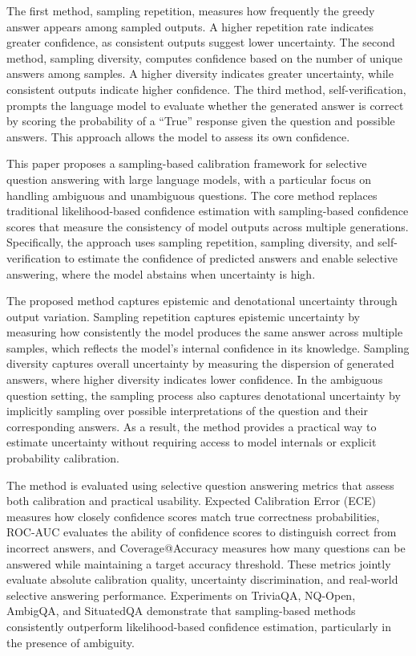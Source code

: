The first method, sampling repetition, measures how frequently the greedy answer appears among sampled outputs. A higher repetition rate indicates greater confidence, as consistent outputs suggest lower uncertainty. The second method, sampling diversity, computes confidence based on the number of unique answers among samples. A higher diversity indicates greater uncertainty, while consistent outputs indicate higher confidence. The third method, self-verification, prompts the language model to evaluate whether the generated answer is correct by scoring the probability of a ``True'' response given the question and possible answers. This approach allows the model to assess its own confidence.

This paper proposes a sampling-based calibration framework for selective question answering with large language models, with a particular focus on handling ambiguous and unambiguous questions. The core method replaces traditional likelihood-based confidence estimation with sampling-based confidence scores that measure the consistency of model outputs across multiple generations. Specifically, the approach uses sampling repetition, sampling diversity, and self-verification to estimate the confidence of predicted answers and enable selective answering, where the model abstains when uncertainty is high.

The proposed method captures epistemic and denotational uncertainty through output variation. Sampling repetition captures epistemic uncertainty by measuring how consistently the model produces the same answer across multiple samples, which reflects the model’s internal confidence in its knowledge. Sampling diversity captures overall uncertainty by measuring the dispersion of generated answers, where higher diversity indicates lower confidence. In the ambiguous question setting, the sampling process also captures denotational uncertainty by implicitly sampling over possible interpretations of the question and their corresponding answers. As a result, the method provides a practical way to estimate uncertainty without requiring access to model internals or explicit probability calibration.

The method is evaluated using selective question answering metrics that assess both calibration and practical usability. Expected Calibration Error (ECE) measures how closely confidence scores match true correctness probabilities, ROC-AUC evaluates the ability of confidence scores to distinguish correct from incorrect answers, and Coverage@Accuracy measures how many questions can be answered while maintaining a target accuracy threshold. These metrics jointly evaluate absolute calibration quality, uncertainty discrimination, and real-world selective answering performance. Experiments on TriviaQA, NQ-Open, AmbigQA, and SituatedQA demonstrate that sampling-based methods consistently outperform likelihood-based confidence estimation, particularly in the presence of ambiguity.

